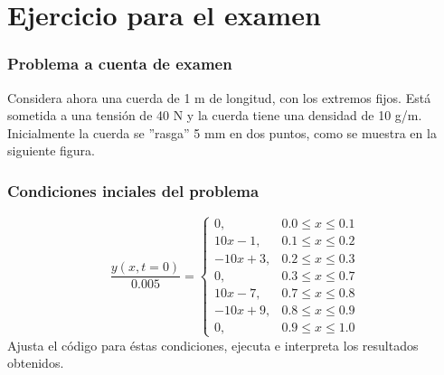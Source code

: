 \section{Ejercicio para el examen}
\begin{frame}[fragile]
\frametitle{Problema a cuenta de examen}
Considera ahora una cuerda de 1 m de longitud, con los extremos fijos. Está sometida a una tensión de 40 N y la cuerda tiene una densidad de 10 g/m. Inicialmente la cuerda se ''rasga'' 5 mm en dos puntos, como se muestra en la siguiente figura.
\begin{center}
\begin{figure}
\end{figure}
\end{center}
\end{frame}
\begin{frame}
\frametitle{Condiciones inciales del problema}
\[ \dfrac{y(x,t=0)}{0.005} =
\begin{cases}
0, & 0.0 \leq x \leq 0.1 \\
10x-1, & 0.1 \leq x \leq 0.2 \\
-10x+3, & 0.2 \leq x \leq 0.3 \\
0, & 0.3 \leq x \leq 0.7 \\
10x-7, & 0.7 \leq x \leq 0.8 \\
-10x+9, & 0.8 \leq x \leq 0.9 \\
0, & 0.9 \leq x \leq 1.0
\end{cases} \]
Ajusta el código para éstas condiciones, ejecuta e interpreta los resultados obtenidos.
\end{frame}
